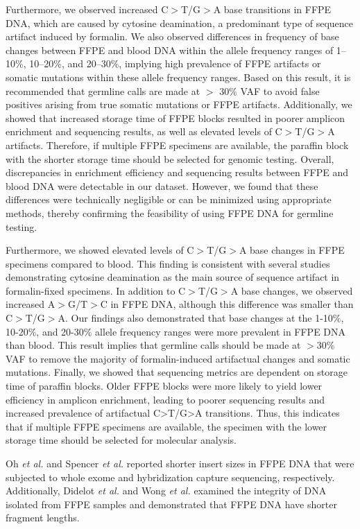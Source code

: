 Furthermore, we observed increased C$>$T/G$>$A base transitions in FFPE DNA, which are caused by cytosine deamination, a predominant type of sequence artifact induced by formalin. We also observed differences in frequency of base changes between FFPE and blood DNA within the allele frequency ranges of 1--10\%, 10--20\%, and 20--30\%, implying high prevalence of FFPE artifacts or somatic mutations within these allele frequency ranges. Based on this result, it is recommended that germline calls are made at $>$ 30\% VAF to avoid false positives arising from true somatic mutations or FFPE artifacts. Additionally, we showed that increased storage time of FFPE blocks resulted in poorer amplicon enrichment and sequencing results, as well as elevated levels of C$>$T/G$>$A artifacts. Therefore, if multiple FFPE specimens are available, the paraffin block with the shorter storage time should be selected for genomic testing. Overall, discrepancies in enrichment efficiency and sequencing results between FFPE and blood DNA were detectable in our dataset. However, we found that these differences were technically negligible or can be minimized using appropriate methods, thereby confirming the feasibility of using FFPE DNA for germline testing.

Furthermore, we showed elevated levels of C$>$T/G$>$A base changes in FFPE specimens compared to blood. This finding is consistent with several studies demonstrating cytosine deamination as the main source of sequence artifact in formalin-fixed specimens. In addition to C$>$T/G$>$A base changes, we observed increased A$>$G/T$>$C in FFPE DNA, although this difference was smaller than C$>$T/G$>$A. Our findings also demonstrated that base changes at the 1-10\%, 10-20\%, and 20-30\% allele frequency ranges were more prevalent in FFPE DNA than blood. This result implies that germline calls should be made at $>$30\% VAF to remove the majority of formalin-induced artifactual changes and somatic mutations. Finally, we showed that sequencing metrics are dependent on storage time of paraffin blocks. Older FFPE blocks were more likely to yield lower efficiency in amplicon enrichment, leading to poorer sequencing results and increased prevalence of artifactual C>T/G>A transitions. Thus, this indicates that if multiple FFPE specimens are available, the specimen with the lower storage time should be selected for molecular analysis.




Oh \textit{et al.}\cite{Oh2015} and Spencer \textit{et al.}\cite{Spencer2013} reported shorter insert sizes in FFPE DNA that were subjected to whole exome and hybridization capture sequencing, respectively. Additionally, Didelot \textit{et al.}\cite{Didelot2013} and Wong \textit{et al.}\cite{Wong2013} examined the integrity of DNA isolated from FFPE samples and demonstrated that FFPE DNA have shorter fragment lengths.

